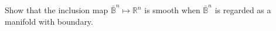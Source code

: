 Show that the inclusion map $\bar{\mathbb{B}}^n \mapsto \mathbb{R}^n$ is smooth when $\bar{\mathbb{B}}^n$ is regarded as a manifold with boundary.
